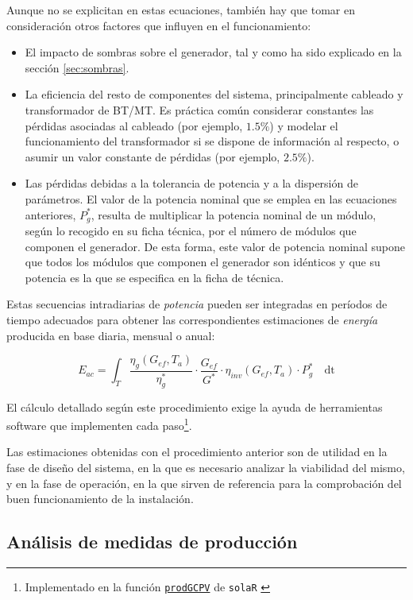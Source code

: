 Aunque no se explicitan en estas ecuaciones, también hay que tomar en consideración otros factores que influyen en el funcionamiento:
\begin{itemize}
\item El impacto de sombras sobre el generador, tal y como ha sido
  explicado en la sección \ref{sec:sombras}.
\item La eficiencia del resto de componentes del sistema,
  principalmente cableado y transformador de BT/MT. Es práctica común
  considerar constantes las pérdidas asociadas al cableado (por
  ejemplo, $1.5\%$) y modelar el funcionamiento del transformador si
  se dispone de información al respecto, o asumir un valor constante
  de pérdidas (por ejemplo, $2.5\%$).
\item Las pérdidas debidas a la tolerancia de potencia y a la
  dispersión de parámetros. El valor de la potencia nominal que se
  emplea en las ecuaciones anteriores, $P_g^*$, resulta de multiplicar
  la potencia nominal de un módulo, según lo recogido en su ficha
  técnica, por el número de módulos que componen el generador. De esta
  forma, este valor de potencia nominal supone que todos los módulos
  que componen el generador son idénticos y que su potencia es la que
  se especifica en la ficha de técnica.
\end{itemize}

Estas secuencias intradiarias de \emph{potencia} pueden ser integradas en períodos de
tiempo adecuados para obtener las correspondientes estimaciones de
\emph{energía} producida en base diaria, mensual o anual:

\begin{equation}
  E_{ac} = \int_T \frac{\eta_g(G_{ef}, T_a)}{\eta_g^*} \cdot
  \frac{G_{ef}}{G^*} \cdot \eta_{inv}(G_{ef}, T_a) \cdot P_g^*\quad \mathrm{dt}  
\end{equation}

El cálculo detallado según este procedimiento exige la ayuda de
herramientas software que implementen cada paso\footnote{Implementado en la
  función \href{http://search.r-project.org/R/library/solaR/html/prodGCPV.html}{\texttt{prodGCPV}} de \texttt{solaR} \cite{Perpinan2012b}}.

Las estimaciones obtenidas con el procedimiento anterior son de utilidad en la fase de diseño del sistema, en la que es necesario analizar la viabilidad del mismo, y en la fase de operación, en la que sirven de referencia para la comprobación del buen funcionamiento de la instalación.

\subsection{Análisis de medidas de producción}
\label{sec:analisis-medidas}

